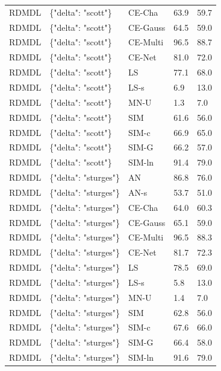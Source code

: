 \begin{tabular}{lllll}
RDMDL & \{"delta": "scott"\} & CE-Cha & 63.9 & 59.7 \\
RDMDL & \{"delta": "scott"\} & CE-Gauss & 64.5 & 59.0 \\
RDMDL & \{"delta": "scott"\} & CE-Multi & 96.5 & 88.7 \\
RDMDL & \{"delta": "scott"\} & CE-Net & 81.0 & 72.0 \\
RDMDL & \{"delta": "scott"\} & LS & 77.1 & 68.0 \\
RDMDL & \{"delta": "scott"\} & LS-s & 6.9 & 13.0 \\
RDMDL & \{"delta": "scott"\} & MN-U & 1.3 & 7.0 \\
RDMDL & \{"delta": "scott"\} & SIM & 61.6 & 56.0 \\
RDMDL & \{"delta": "scott"\} & SIM-c & 66.9 & 65.0 \\
RDMDL & \{"delta": "scott"\} & SIM-G & 66.2 & 57.0 \\
RDMDL & \{"delta": "scott"\} & SIM-ln & 91.4 & 79.0 \\
RDMDL & \{"delta": "sturges"\} & AN & 86.8 & 76.0 \\
RDMDL & \{"delta": "sturges"\} & AN-s & 53.7 & 51.0 \\
RDMDL & \{"delta": "sturges"\} & CE-Cha & 64.0 & 60.3 \\
RDMDL & \{"delta": "sturges"\} & CE-Gauss & 65.1 & 59.0 \\
RDMDL & \{"delta": "sturges"\} & CE-Multi & 96.5 & 88.3 \\
RDMDL & \{"delta": "sturges"\} & CE-Net & 81.7 & 72.3 \\
RDMDL & \{"delta": "sturges"\} & LS & 78.5 & 69.0 \\
RDMDL & \{"delta": "sturges"\} & LS-s & 5.8 & 13.0 \\
RDMDL & \{"delta": "sturges"\} & MN-U & 1.4 & 7.0 \\
RDMDL & \{"delta": "sturges"\} & SIM & 62.8 & 56.0 \\
RDMDL & \{"delta": "sturges"\} & SIM-c & 67.6 & 66.0 \\
RDMDL & \{"delta": "sturges"\} & SIM-G & 66.4 & 58.0 \\
RDMDL & \{"delta": "sturges"\} & SIM-ln & 91.6 & 79.0 \\
\bottomrule
\end{tabular}
